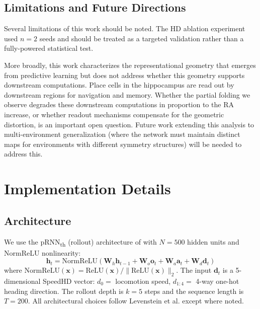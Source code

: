 \documentclass[11pt, a4paper]{article}
\begin{document}
\subsection{Limitations and Future Directions}

Several limitations of this work should be noted. The HD ablation
experiment used $n=2$ seeds and should be treated as a targeted
validation rather than a fully-powered statistical test.

More broadly, this work characterizes the representational geometry that
emerges from predictive learning but does not address whether this
geometry supports downstream computations. Place cells in the hippocampus
are read out by downstream regions for navigation and memory. Whether the
partial folding we observe degrades these downstream computations in
proportion to the RA increase, or whether readout mechanisms compensate
for the geometric distortion, is an important open question. Future work
extending this analysis to multi-environment generalization (where
the network must maintain distinct maps for environments with different
symmetry structures) will be needed to address this.









\appendix
\section{Implementation Details}
\label{app:implementation}

\subsection*{Architecture}
We use the pRNN\textsubscript{th} (rollout) architecture of
\citet{levenstein2024} with $N=500$ hidden units and NormReLU nonlinearity:
\begin{equation}
    \mathbf{h}_t = \text{NormReLU}\!\left(\mathbf{W}_h\mathbf{h}_{t-1} +
    \mathbf{W}_o\mathbf{o}_t + \mathbf{W}_a\mathbf{a}_t +
    \mathbf{W}_d\mathbf{d}_t\right)
\end{equation}
where $\text{NormReLU}(\mathbf{x}) = \text{ReLU}(\mathbf{x}) /
\|\text{ReLU}(\mathbf{x})\|_2$. The input $\mathbf{d}_t$ is a 5-dimensional
SpeedHD vector: $d_0 =$ locomotion speed, $d_{1:4} =$ 4-way one-hot
heading direction. The rollout depth is $k=5$ steps and the sequence
length is $T=200$. All architectural choices follow Levenstein et al.
except where noted.
\end{document}
